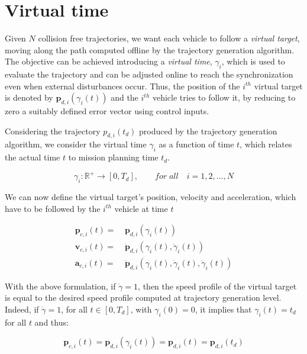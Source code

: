 \section{Virtual time\label{sec:virtual_time}}

Given $ N $ collision free trajectories, we want each vehicle to follow a \textit{virtual target},
moving along the path computed offline by the trajectory generation algorithm.
The objective can be achieved introducing a \textit{virtual time}, $ \gamma_i $,
which is used to evaluate the trajectory and can be adjusted online to reach
the synchronization even when external disturbances occur.
Thus, the position of the $ i^{th} $ virtual target is denoted by $ \bm{p}_{d,i} ( \gamma_i (t))$
and the $ i^{th} $ vehicle tries to follow it, by reducing to zero a suitably defined
error vector using control inputs.

Considering the trajectory $ p_{d,i} (t_d) $ produced by the trajectory generation
algorithm, we consider the virtual time $ \gamma_i $ as a function of time $ t $,
which relates the actual time $t$ to mission planning time $t_d$.

\begin{equation}  \label{eq:virt_time_func}
  \gamma_i : \mathbb{R}^+ \rightarrow [0, T_d], \qquad for \; all \quad i = 1,2,\dots,N
\end{equation}

We can now define the virtual target's position, velocity and acceleration, which
have to be followed by the $ i^{th}$ vehicle at time $t$

\begin{equation}  \label{eq:pos_vel_acc_def}
  \begin{aligned}
  \bm{p}_{c,i}(t) = \ & \bm{p}_{d,i}(\gamma_i(t)) \\
  \bm{v}_{c,i}(t) = \ & \dot{\bm{p}}_{d,i} (\gamma_i(t), \dot{\gamma}_i (t)) \\
  \bm{a}_{c,i}(t) = \ & \ddot{\bm{p}}_{d,i} (\gamma_i(t), \dot{\gamma}_i(t), \ddot{\gamma}_i(t))
  \end{aligned}
\end{equation}

With the above formulation, if $ \dot{\gamma} = 1$, then the speed profile of
the virtual target is equal to the desired speed profile computed at trajectory
generation level.
Indeed, if $ \dot{\gamma} = 1$, for all $t \in [0, T_d]$, with $\gamma_i(0) = 0$,
it implies that $\gamma_i(t) = t_d$ for all $t$ and thus:

\begin{equation*}
  \bm{p}_{c,i}(t) = \bm{p}_{d,i}(\gamma_i(t)) = \bm{p}_{d,i}(t) = \bm{p}_{d,i} (t_d)
\end{equation*}

